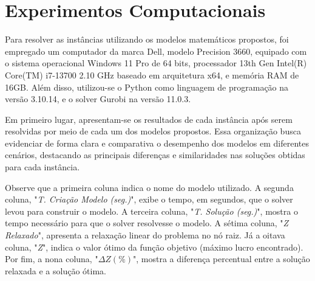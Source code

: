 

\section{Experimentos Computacionais}
Para resolver as instâncias utilizando os modelos matemáticos propostos, foi empregado um computador da marca Dell, modelo Precision 3660, equipado com o sistema operacional Windows 11 Pro de 64 bits, processador 13th Gen Intel(R) Core(TM) i7-13700 2.10 GHz baseado em arquitetura x64, e memória RAM de 16GB. Além disso, utilizou-se o Python como linguagem de programação na versão 3.10.14, e o solver Gurobi na versão 11.0.3.

Em primeiro lugar, apresentam-se os resultados de cada instância após serem resolvidas por meio de cada um dos modelos propostos. Essa organização busca evidenciar de forma clara e comparativa o desempenho dos modelos em diferentes cenários, destacando as principais diferenças e similaridades nas soluções obtidas para cada instância.

Observe que a primeira coluna indica o nome do modelo utilizado. A segunda coluna, "\textit{T. Criação Modelo (seg.)}", exibe o tempo, em segundos, que o solver levou para construir o modelo. A terceira coluna, "\textit{T. Solução (seg.)}", mostra o tempo necessário para que o solver resolvesse o modelo. A sétima coluna, "\textit{Z Relaxado}", apresenta a relaxação linear do problema no nó raiz. Já a oitava coluna, "\textit{Z\*}", indica o valor ótimo da função objetivo (máximo lucro encontrado). Por fim, a nona coluna, "\textit{$ \Delta Z (\%)$}", mostra a diferença percentual entre a solução relaxada e a solução ótima.


